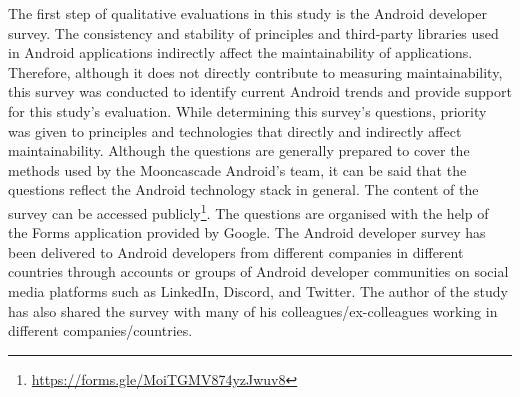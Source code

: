 The first step of qualitative evaluations in this study is the Android developer survey. The consistency and stability of principles and third-party libraries used in Android applications indirectly affect the maintainability of applications. Therefore, although it does not directly contribute to measuring maintainability, this survey was conducted to identify current Android trends and provide support for this study's evaluation. While determining this survey's questions, priority was given to principles and technologies that directly and indirectly affect maintainability. Although the questions are generally prepared to cover the methods used by the Mooncascade Android's team, it can be said that the questions reflect the Android technology stack in general. The content of the survey can be accessed publicly\footnote{\url{https://forms.gle/MoiTGMV874yzJwuv8}}. The questions are organised with the help of the Forms application provided by Google. The Android developer survey has been delivered to Android developers from different companies in different countries through accounts or groups of Android developer communities on social media platforms such as LinkedIn, Discord, and Twitter. The author of the study has also shared the survey with many of his colleagues/ex-colleagues working in different companies/countries.